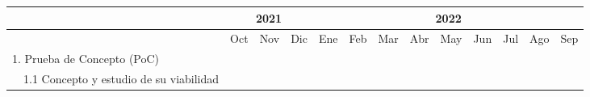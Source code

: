 \documentclass{subfiles}
\begin{document}
\begin{landscape}
\begin{table}%
\begin{tabular}{|ll|ccc|ccccccccc|}
\hline
\multicolumn{2}{|l|}{}                                                        & \multicolumn{3}{c|}{2021}                                                                                                & \multicolumn{9}{c|}{2022}                                                                                                                                                                                                                                                                                                                                                                                                \\ \hline
\multicolumn{2}{|l|}{}                                                        & \multicolumn{1}{c|}{Oct}                      & \multicolumn{1}{c|}{Nov}                      & Dic                      & \multicolumn{1}{c|}{Ene}                      & \multicolumn{1}{c|}{Feb}                      & \multicolumn{1}{c|}{Mar}                      & \multicolumn{1}{c|}{Abr}                      & \multicolumn{1}{c|}{May}                      & \multicolumn{1}{c|}{Jun}                      & \multicolumn{1}{c|}{Jul}                      & \multicolumn{1}{c|}{Ago}                      & Sep                      \\ \hline
\multicolumn{2}{|l|}{1. Prueba de Concepto (PoC)}                             & \multicolumn{1}{c|}{\cellcolor[HTML]{656565}} & \multicolumn{1}{c|}{\cellcolor[HTML]{656565}} & \cellcolor[HTML]{656565} & \multicolumn{1}{c|}{}                         & \multicolumn{1}{c|}{}                         & \multicolumn{1}{c|}{}                         & \multicolumn{1}{c|}{}                         & \multicolumn{1}{c|}{}                         & \multicolumn{1}{c|}{}                         & \multicolumn{1}{c|}{}                         & \multicolumn{1}{c|}{}                         &                          \\ \hline
              & 1.1 Concepto y estudio de su viabilidad                       & \multicolumn{1}{c|}{\cellcolor[HTML]{9B9B9B}} & \multicolumn{1}{c|}{}                         &                          & \multicolumn{1}{c|}{}                         & \multicolumn{1}{c|}{}                         & \multicolumn{1}{c|}{}                         & \multicolumn{1}{c|}{}                         & \multicolumn{1}{c|}{}                         & \multicolumn{1}{c|}{}                         & \multicolumn{1}{c|}{}                         & \multicolumn{1}{c|}{}                         &                          \\ \hline

\end{tabular}
\end{table}
\end{landscape}
\end{document}
